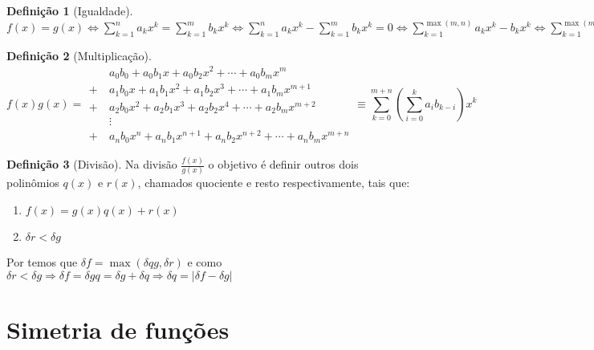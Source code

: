 \documentclass[
]{book}
\providecommand{\tightlist}{%
  \setlength{\itemsep}{0pt}\setlength{\parskip}{0pt}}
\theoremstyle{definition}
\newtheorem{definition}{Definição}[chapter]
\theoremstyle{definition}
\theoremstyle{definition}
\theoremstyle{definition}
\theoremstyle{remark}
\begin{document}
\begin{definition}[Igualdade]
\protect\hypertarget{def:igualdadepolinomio}{}\label{def:igualdadepolinomio}\(f(x) = g(x) \Leftrightarrow \sum_{k=1}^n a_kx^k = \sum_{k=1}^m b_kx^k \Leftrightarrow \sum_{k=1}^n a_kx^k - \sum_{k=1}^m b_kx^k = 0 \Leftrightarrow \sum_{k=1}^{\max(m,n)} a_kx^k - b_kx^k \Leftrightarrow \sum_{k=1}^{\max(m,n)} (a_k - b_k)x^k \Leftrightarrow a_k = b_k\)
\end{definition}

\begin{definition}[Multiplicação]
\protect\hypertarget{def:prodpolinomio}{}\label{def:prodpolinomio}\[
f(x)g(x) = 
\begin{aligned}
    &a_0b_0 
    + a_0b_1x 
    + a_0b_2x^2 
    + \cdots 
    + a_0b_mx^m \\
  +\ &a_1b_0x 
    + a_1b_1x^2 
    + a_1b_2x^3 
    + \cdots 
    + a_1b_mx^{m+1} \\
  +\ &a_2b_0x^2 
    + a_2b_1x^3 
    + a_2b_2x^4 
    + \cdots 
    + a_2b_mx^{m+2} \\
  &\vdots \\
  +\ &a_nb_0x^n 
    + a_nb_1x^{n+1} 
    + a_nb_2x^{n+2} 
    + \cdots 
    + a_nb_mx^{m+n}
\end{aligned}
\equiv \sum_{k=0}^{m+n} \left( \sum_{i=0}^k a_i b_{k-i} \right) x^k
\]
\end{definition}

\begin{definition}[Divisão]
\protect\hypertarget{def:divpolinomio}{}\label{def:divpolinomio}Na divisão \(\frac{f(x)}{g(x)}\) o objetivo é definir outros dois polinômios \(q(x)\) e \(r(x)\), chamados quociente e resto respectivamente, tais que:

\begin{enumerate}
\def\labelenumi{\arabic{enumi}.}
\tightlist
\item
  \(f(x) = g(x)q(x) + r(x)\)
\item
  \(\delta r < \delta g\)
\end{enumerate}

Por \citep{somapolinomio} temos que \(\delta f = \max (\delta qg, \delta r)\) e como \(\delta r < \delta g \Rightarrow \delta f = \delta gq = \delta g + \delta q \Rightarrow \delta q = |\delta f - \delta g|\)
\end{definition}

\chapter{Simetria de funções}\label{simetria-de-funuxe7uxf5es}
\end{document}
